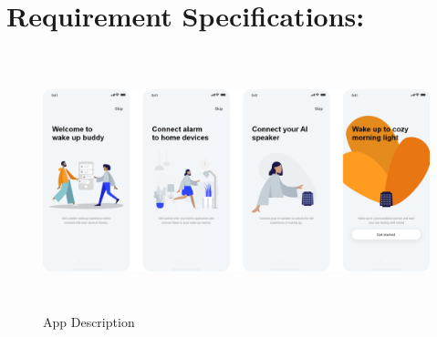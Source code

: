 \documentclass[conference]{IEEEtran}
\begin{document}
\section{Requirement Specifications:}

\begin{figure}[!b]
    \centerline{\includegraphics[height=75mm,scale=1]{Images/AppDes.png}}
    \caption{App Description}
    \label{fig}  
\end{figure}
\end{document}
